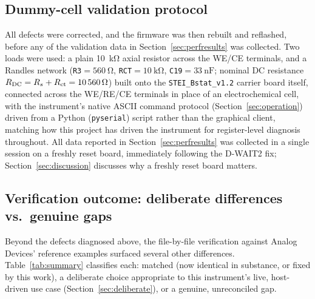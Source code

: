 \subsection{Dummy-cell validation protocol}
\label{sec:protocol}
All defects were corrected, and the firmware was then rebuilt and
reflashed, before any of the validation data in
Section~\ref{sec:perfresults} was collected. Two loads were used: a plain
\SI{10}{\kilo\ohm} axial resistor across the WE/CE terminals, and a
Randles network (\texttt{R3}$=\SI{560}{\ohm}$,
\texttt{RCT}$=\SI{10}{\kilo\ohm}$, \texttt{C19}$=\SI{33}{\nano\farad}$;
nominal DC resistance $R_{\mathrm{DC}}=R_{s}+R_{\mathrm{ct}}=\SI{10560}{\ohm}$) built
onto the \texttt{STEI\_Bstat\_v1.2} carrier board itself, connected across
the WE/RE/CE terminals in place of an electrochemical cell, with the
instrument's native ASCII command protocol (Section~\ref{sec:operation})
driven from a Python (\texttt{pyserial}) script rather than the graphical
client, matching how this project has driven the instrument for
register-level diagnosis throughout. All data reported in
Section~\ref{sec:perfresults} was collected in a single session on a
freshly reset board, immediately following the D-WAIT2 fix;
Section~\ref{sec:discussion} discusses why a freshly reset board matters.

\subsection{Verification outcome: deliberate differences vs.\ genuine gaps}
\label{sec:verification-outcome}
Beyond the defects diagnosed above, the file-by-file verification
against Analog Devices' reference examples surfaced several other
differences. Table~\ref{tab:summary} classifies each: matched (now
identical in substance, or fixed by this work), a deliberate choice
appropriate to this instrument's live, host-driven use case
(Section~\ref{sec:deliberate}), or a genuine, unreconciled gap.

